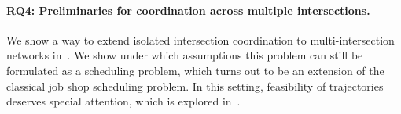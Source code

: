 \documentclass{report}
\theoremstyle{definition}
\theoremstyle{plain}
\begin{document}
\paragraph{RQ4: Preliminaries for coordination across multiple intersections.}

We show a way to extend isolated intersection coordination to multi-intersection
networks in~. We show under which assumptions this
problem can still be formulated as a scheduling problem, which turns out to be
an extension of the classical job shop scheduling problem.
%
In this setting, feasibility of trajectories deserves special attention, which
is explored in~.





\end{document}
